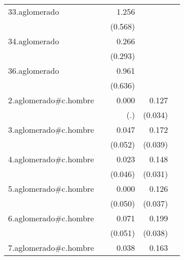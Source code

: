 {\begin{longtable}{l*{4}{D{.}{.}{-1}}}
\addlinespace
33.aglomerado&                     &       1.256\sym{*}  &                     &                     \\
            &                     &     (0.568)         &                     &                     \\
\addlinespace
34.aglomerado&                     &       0.266         &                     &                     \\
            &                     &     (0.293)         &                     &                     \\
\addlinespace
36.aglomerado&                     &       0.961         &                     &                     \\
            &                     &     (0.636)         &                     &                     \\
\addlinespace
2.aglomerado#c.hombre&                     &       0.000         &       0.127\sym{***}&                     \\
            &                     &         (.)         &     (0.034)         &                     \\
\addlinespace
3.aglomerado#c.hombre&                     &       0.047         &       0.172\sym{***}&                     \\
            &                     &     (0.052)         &     (0.039)         &                     \\
\addlinespace
4.aglomerado#c.hombre&                     &       0.023         &       0.148\sym{***}&                     \\
            &                     &     (0.046)         &     (0.031)         &                     \\
\addlinespace
5.aglomerado#c.hombre&                     &       0.000         &       0.126\sym{***}&                     \\
            &                     &     (0.050)         &     (0.037)         &                     \\
\addlinespace
6.aglomerado#c.hombre&                     &       0.071         &       0.199\sym{***}&                     \\
            &                     &     (0.051)         &     (0.038)         &                     \\
\addlinespace
7.aglomerado#c.hombre&                     &       0.038         &       0.163\sym{***}&                     \\

\end{longtable}}
